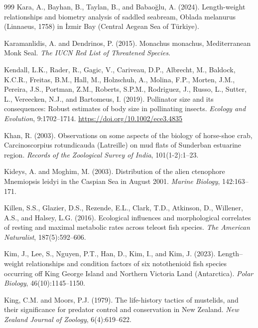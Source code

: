 \begin{thebibliography}{999}
Kara, A., Bayhan, B., Taylan, B., and Babao{\u{g}}lu, A. (2024). Length-weight relationships and biometry analysis of saddled seabream, Oblada melanurus (Linnaeus, 1758) in {\.I}zmir Bay (Central Aegean Sea of T{\"u}rkiye).

Karamanlidis, A. and Dendrinos, P. (2015). Monachus monachus, Mediterranean Monk Seal. \textit{The IUCN Red List of Threatened Species}.

Kendall, L.K., Rader, R., Gagic, V., Cariveau, D.P., Albrecht, M., Baldock, K.C.R., Freitas, B.M., Hall, M., Holzschuh, A., Molina, F.P., Morten, J.M., Pereira, J.S., Portman, Z.M., Roberts, S.P.M., Rodriguez, J., Russo, L., Sutter, L., Vereecken, N.J., and Bartomeus, I. (2019). Pollinator size and its consequences: Robust estimates of body size in pollinating insects. \textit{Ecology and Evolution}, 9:1702--1714. \url{https://doi.org/10.1002/ece3.4835}

Khan, R. (2003). Observations on some aspects of the biology of horse-shoe crab, Carcinoscorpius rotundicauda (Latreille) on mud flats of Sunderban estuarine region. \textit{Records of the Zoological Survey of India}, 101(1-2):1--23.

Kideys, A. and Moghim, M. (2003). Distribution of the alien ctenophore Mnemiopsis leidyi in the Caspian Sea in August 2001. \textit{Marine Biology}, 142:163--171.

Killen, S.S., Glazier, D.S., Rezende, E.L., Clark, T.D., Atkinson, D., Willener, A.S., and Halsey, L.G. (2016). Ecological influences and morphological correlates of resting and maximal metabolic rates across teleost fish species. \textit{The American Naturalist}, 187(5):592--606.

Kim, J., Lee, S., Nguyen, P.T., Han, D., Kim, I., and Kim, J. (2023). Length--weight relationships and condition factors of six notothenioid fish species occurring off King George Island and Northern Victoria Land (Antarctica). \textit{Polar Biology}, 46(10):1145--1150.

King, C.M. and Moors, P.J. (1979). The life-history tactics of mustelids, and their significance for predator control and conservation in New Zealand. \textit{New Zealand Journal of Zoology}, 6(4):619--622.


\end{thebibliography}
